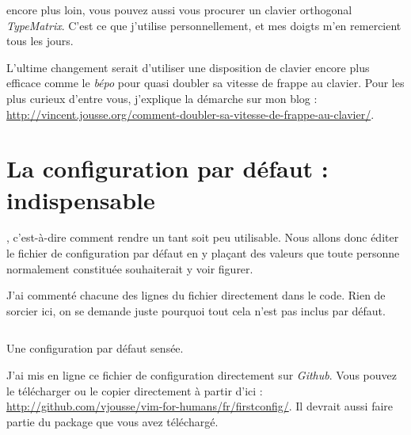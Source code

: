  encore plus loin, vous pouvez aussi vous procurer un clavier orthogonal \emph{TypeMatrix}. C'est ce que j'utilise personnellement, et mes doigts m'en remercient tous les jours.

L'ultime changement serait d'utiliser une disposition de clavier encore plus efficace comme le \emph{bépo} pour quasi doubler sa vitesse de frappe au clavier. Pour les plus curieux d'entre vous, j'explique la démarche sur mon blog : \url{http://vincent.jousse.org/comment-doubler-sa-vitesse-de-frappe-au-clavier/}.


\newpage
\section{La configuration par défaut : indispensable}

, c'est-à-dire comment rendre \vim un tant soit peu utilisable. Nous allons donc éditer le fichier de configuration par défaut \vimrc{} en y plaçant des valeurs que toute personne normalement constituée souhaiterait y voir figurer.

J'ai commenté chacune des lignes du fichier directement dans le code. Rien de sorcier ici, on se demande juste pourquoi tout cela n'est pas inclus par défaut.

\begin{listing}[H]
    \inputminted[bgcolor=bg, fontsize=\footnotesize]{vim}{../../vim-for-humans/firstconfig/vimrc}
    \caption{Une configuration par défaut sensée.}
    \label{code:first-config}
\end{listing}

J'ai mis en ligne ce fichier de configuration directement sur \emph{Github}. Vous pouvez le télécharger ou le copier directement à partir d'ici : \url{http://github.com/vjousse/vim-for-humans/fr/firstconfig/}. Il devrait aussi faire partie du package que vous avez téléchargé.

